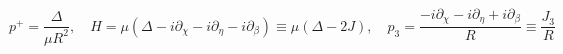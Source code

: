 \begin{equation}  \label{dict2IIB}
p^+  =  \frac{\Delta}{\mu R^2}, \quad
H  =  \mu \left( \Delta - i\partial_\chi -  i\partial_\eta -i \partial_\beta \right) \equiv
              \mu \left( \Delta - 2 J \right), \quad
p_3 = \frac{ - i\partial_\chi -  i\partial_\eta + i \partial_\beta}{R} \equiv \frac{J_3}{R}\end{equation}

